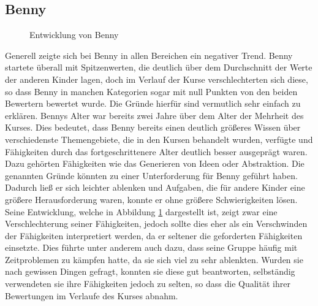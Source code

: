 \subsection*{Benny}
\begin{figure}[H]
	\centering
	\caption{Entwicklung von Benny}
	\label{img:bennyDevelopment}
\end{figure}
 Generell zeigte sich bei Benny in allen Bereichen ein negativer Trend. Benny startete überall mit Spitzenwerten, die deutlich über dem Durchschnitt der Werte der anderen Kinder lagen, doch im Verlauf der Kurse verschlechterten sich diese, so dass Benny in manchen Kategorien sogar mit null Punkten von den beiden Bewertern bewertet wurde. Die Gründe hierfür sind vermutlich sehr einfach zu erklären. Bennys Alter war bereits zwei Jahre über dem Alter der Mehrheit des Kurses. Dies bedeutet, dass Benny bereits einen deutlich größeres Wissen über verschiedenste Themengebiete, die in den Kursen behandelt wurden, verfügte und Fähigkeiten durch das fortgeschrittenere Alter deutlich besser ausgeprägt waren. Dazu gehörten Fähigkeiten wie das Generieren von Ideen oder Abstraktion. Die genannten Gründe könnten zu einer Unterforderung für Benny geführt haben. Dadurch ließ er sich leichter ablenken und Aufgaben, die für andere Kinder eine größere Herausforderung waren, konnte er ohne größere Schwierigkeiten lösen. Seine Entwicklung, welche in Abbildung \ref{img:bennyDevelopment} dargestellt ist, zeigt zwar eine Verschlechterung seiner Fähigkeiten, jedoch sollte dies eher als ein Verschwinden der Fähigkeiten interpretiert werden, da er seltener die geforderten Fähigkeiten einsetzte. Dies führte unter anderem auch dazu, dass seine Gruppe häufig mit Zeitproblemen zu kämpfen hatte, da sie sich viel zu sehr ablenkten. Wurden sie nach gewissen Dingen gefragt, konnten sie diese gut beantworten, selbständig verwendeten sie ihre Fähigkeiten jedoch zu selten, so dass die Qualität ihrer Bewertungen im Verlaufe des Kurses abnahm.



